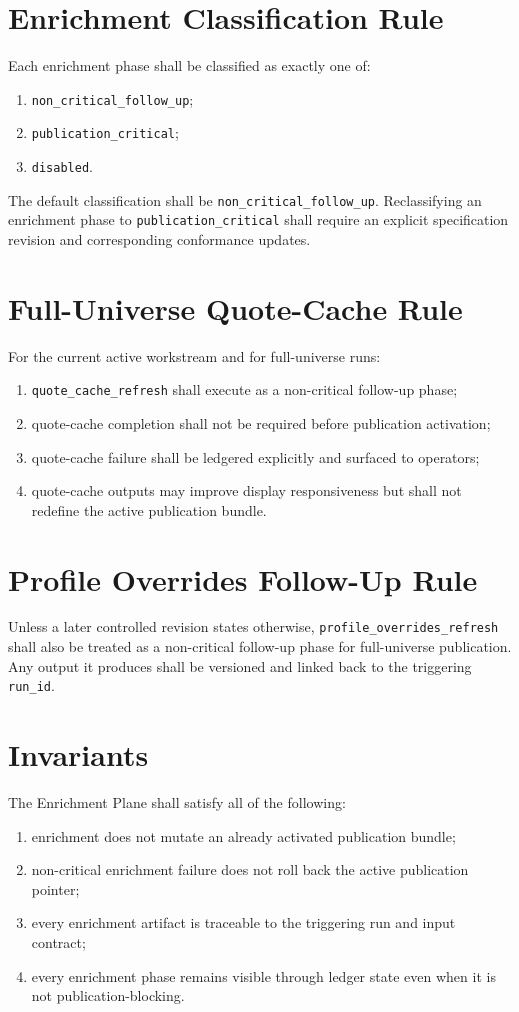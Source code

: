 \documentclass[11pt]{report}
\begin{document}
\section{Enrichment Classification Rule}
Each enrichment phase shall be classified as exactly one of:
\begin{enumerate}[leftmargin=1.2cm]
    \item \texttt{non\_critical\_follow\_up};
    \item \texttt{publication\_critical};
    \item \texttt{disabled}.
\end{enumerate}

The default classification shall be \texttt{non\_critical\_follow\_up}. Reclassifying an enrichment phase to \texttt{publication\_critical} shall require an explicit specification revision and corresponding conformance updates.

\section{Full-Universe Quote-Cache Rule}
For the current active workstream and for full-universe runs:
\begin{enumerate}[leftmargin=1.2cm]
    \item \texttt{quote\_cache\_refresh} shall execute as a non-critical follow-up phase;
    \item quote-cache completion shall not be required before publication activation;
    \item quote-cache failure shall be ledgered explicitly and surfaced to operators;
    \item quote-cache outputs may improve display responsiveness but shall not redefine the active publication bundle.
\end{enumerate}

\section{Profile Overrides Follow-Up Rule}
Unless a later controlled revision states otherwise, \texttt{profile\_overrides\_refresh} shall also be treated as a non-critical follow-up phase for full-universe publication. Any output it produces shall be versioned and linked back to the triggering \texttt{run\_id}.

\section{Invariants}
The Enrichment Plane shall satisfy all of the following:
\begin{enumerate}[leftmargin=1.2cm]
    \item enrichment does not mutate an already activated publication bundle;
    \item non-critical enrichment failure does not roll back the active publication pointer;
    \item every enrichment artifact is traceable to the triggering run and input contract;
    \item every enrichment phase remains visible through ledger state even when it is not publication-blocking.
\end{enumerate}
\end{document}
